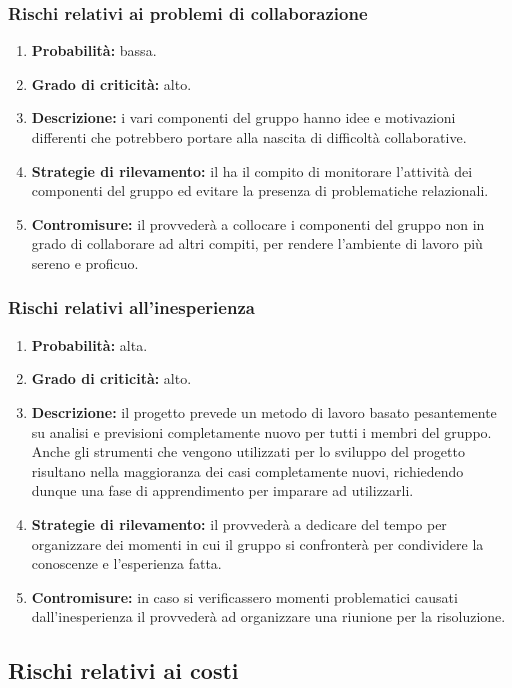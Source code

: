\subsubsection{Rischi relativi ai problemi di collaborazione}
\begin{enumerate}
	\item \textbf{Probabilità:} bassa.
	\item \textbf{Grado di criticità:} alto.
	\item \textbf{Descrizione:} i vari componenti del gruppo hanno idee e motivazioni differenti che potrebbero portare alla nascita di difficoltà collaborative.
	\item \textbf{Strategie di rilevamento:} il \Responsabile{} ha il compito di monitorare l'attività dei componenti del gruppo ed evitare la presenza di problematiche relazionali.
	\item \textbf{Contromisure:} il \Responsabile{} provvederà a collocare i componenti del gruppo non in grado di collaborare ad altri compiti, per rendere l'ambiente di lavoro più sereno e proficuo.
\end{enumerate}

\subsubsection{Rischi relativi all'inesperienza}
\begin{enumerate}
	\item \textbf{Probabilità:} alta.
	\item \textbf{Grado di criticità:} alto.
	\item \textbf{Descrizione:} il progetto prevede un metodo di lavoro basato pesantemente su analisi e previsioni completamente nuovo per tutti i membri del gruppo. Anche gli strumenti che vengono utilizzati per lo sviluppo del progetto risultano nella maggioranza dei casi completamente nuovi, richiedendo dunque una fase di apprendimento per imparare ad utilizzarli.
	\item \textbf{Strategie di rilevamento:} il \Responsabile{} provvederà a dedicare del tempo per organizzare dei momenti in cui il gruppo si confronterà per condividere la conoscenze e l'esperienza fatta.
	\item \textbf{Contromisure:} in caso si verificassero momenti problematici causati dall'inesperienza il \Responsabile{} provvederà ad organizzare una riunione per la risoluzione.
\end{enumerate}

\subsection{Rischi relativi ai costi}
